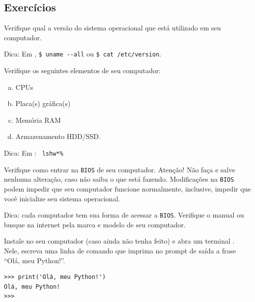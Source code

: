 \subsection{Exercícios}

\begin{exer}
  Verifique qual a versão do sistema operacional que está utilizado em seu computador.
\end{exer}
\begin{resp}
  Dica: Em {\linux}, \lstinline+$ uname --all+ ou \lstinline+$ cat /etc/version+.
\end{resp}

\begin{exer}
  Verifique os seguintes elementos de seu computador:
  \begin{enumerate}[a)]
  \item CPUs
  \item Placa(s) gráfica(s)
  \item Memória RAM
  \item Armazenamento HDD/SSD.
  \end{enumerate}
\end{exer}
\begin{resp}
  Dica: Em {\linux}: \lstinline*$ lshw*%
\end{resp}

\begin{exer}
  Verifique como entrar na \lstinline+BIOS+ de seu computador. Atenção! Não faça  e salve nenhuma alteração, caso não saiba o que está fazendo. Modificações na \lstinline+BIOS+ podem impedir que seu computador funcione normalmente, inclusive, impedir que você inicialize seu sistema operacional.
\end{exer}
\begin{resp}
  Dica: cada computador tem sua forma de acessar a \lstinline+BIOS+. Verifique o manual ou busque na internet pela marca e modelo de seu computador.
\end{resp}

\begin{exer}
  Instale {\python} no seu computador (caso ainda não tenha feito) e abra um terminal {\python}. Nele, escreva uma linha de comando que imprima no prompt de saída a frase ``Olá, meu Python!''.
\end{exer}
\begin{resp}

\begin{lstlisting}
>>> print('Olá, meu Python!')
Olá, meu Python!
>>> 
\end{lstlisting}

\end{resp}


